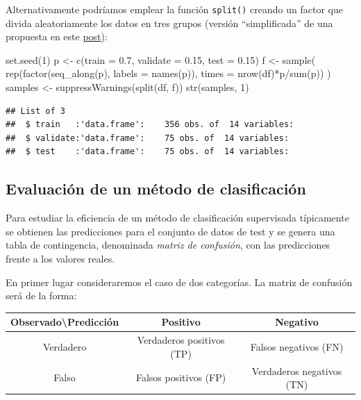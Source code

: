 \documentclass[
]{book}
\newenvironment{Shaded}{\begin{snugshade}}{\end{snugshade}}
\newcommand{\AttributeTok}[1]{\textcolor[rgb]{0.77,0.63,0.00}{#1}}
\newcommand{\DecValTok}[1]{\textcolor[rgb]{0.00,0.00,0.81}{#1}}
\newcommand{\FloatTok}[1]{\textcolor[rgb]{0.00,0.00,0.81}{#1}}
\newcommand{\FunctionTok}[1]{\textcolor[rgb]{0.00,0.00,0.00}{#1}}
\newcommand{\NormalTok}[1]{#1}
\newcommand{\OtherTok}[1]{\textcolor[rgb]{0.56,0.35,0.01}{#1}}
\newcommand{\SpecialCharTok}[1]{\textcolor[rgb]{0.00,0.00,0.00}{#1}}
\theoremstyle{break}
\theoremstyle{definition}
\theoremstyle{definition}
\theoremstyle{definition}
\theoremstyle{definition}
\theoremstyle{remark}
\begin{document}
Alternativamente podríamos emplear la función \texttt{split()} creando un factor que divida aleatoriamente los datos en tres grupos (versión ``simplificada'' de una propuesta en este \href{https://stackoverflow.com/questions/36068963/r-how-to-split-a-data-frame-into-training-validation-and-test-sets}{post}):

\begin{Shaded}
\begin{Highlighting}[]
\FunctionTok{set.seed}\NormalTok{(}\DecValTok{1}\NormalTok{)}
\NormalTok{p }\OtherTok{\textless{}{-}} \FunctionTok{c}\NormalTok{(}\AttributeTok{train =} \FloatTok{0.7}\NormalTok{, }\AttributeTok{validate =} \FloatTok{0.15}\NormalTok{, }\AttributeTok{test =} \FloatTok{0.15}\NormalTok{)}
\NormalTok{f }\OtherTok{\textless{}{-}} \FunctionTok{sample}\NormalTok{( }\FunctionTok{rep}\NormalTok{(}\FunctionTok{factor}\NormalTok{(}\FunctionTok{seq\_along}\NormalTok{(p), }\AttributeTok{labels =} \FunctionTok{names}\NormalTok{(p)),}
                 \AttributeTok{times =} \FunctionTok{nrow}\NormalTok{(df)}\SpecialCharTok{*}\NormalTok{p}\SpecialCharTok{/}\FunctionTok{sum}\NormalTok{(p)) )}
\NormalTok{samples }\OtherTok{\textless{}{-}} \FunctionTok{suppressWarnings}\NormalTok{(}\FunctionTok{split}\NormalTok{(df, f))}
\FunctionTok{str}\NormalTok{(samples, }\DecValTok{1}\NormalTok{)}
\end{Highlighting}
\end{Shaded}

\begin{verbatim}
## List of 3
##  $ train   :'data.frame':    356 obs. of  14 variables:
##  $ validate:'data.frame':    75 obs. of  14 variables:
##  $ test    :'data.frame':    75 obs. of  14 variables:
\end{verbatim}

\hypertarget{eval-class}{%
\subsection{Evaluación de un método de clasificación}\label{eval-class}}

Para estudiar la eficiencia de un método de clasificación supervisada típicamente se obtienen las predicciones para el conjunto de datos de test y se genera una tabla de contingencia, denominada \emph{matriz de confusión}, con las predicciones frente a los valores reales.

En primer lugar consideraremos el caso de dos categorías.
La matriz de confusión será de la forma:

\begin{longtable}[]{@{}ccc@{}}
\toprule
Observado\textbackslash Predicción & Positivo & Negativo \\
\midrule
\endhead
Verdadero & Verdaderos positivos (TP) & Falsos negativos (FN) \\
Falso & Falsos positivos (FP) & Verdaderos negativos (TN) \\
\bottomrule
\end{longtable}
\end{document}
